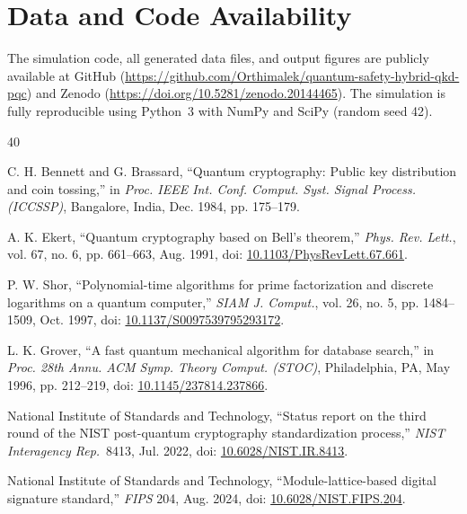 \documentclass[conference]{IEEEtran}
\begin{document}
\section*{Data and Code Availability}
The simulation code, all generated data files, and output figures are publicly available at GitHub (\url{https://github.com/Orthimalek/quantum-safety-hybrid-qkd-pqc}) and Zenodo (\url{https://doi.org/10.5281/zenodo.20144465}). The simulation is fully reproducible using Python~3 with NumPy and SciPy (random seed 42).

\begin{thebibliography}{40}

C. H. Bennett and G. Brassard, ``Quantum cryptography: Public key distribution and coin tossing,'' in \emph{Proc. IEEE Int. Conf. Comput. Syst. Signal Process. (ICCSSP)}, Bangalore, India, Dec. 1984, pp. 175--179.

A. K. Ekert, ``Quantum cryptography based on Bell's theorem,'' \emph{Phys. Rev. Lett.}, vol. 67, no. 6, pp. 661--663, Aug. 1991, doi: \href{https://doi.org/10.1103/PhysRevLett.67.661}{10.1103/PhysRevLett.67.661}.

P. W. Shor, ``Polynomial-time algorithms for prime factorization and discrete logarithms on a quantum computer,'' \emph{SIAM J. Comput.}, vol. 26, no. 5, pp. 1484--1509, Oct. 1997, doi: \href{https://doi.org/10.1137/S0097539795293172}{10.1137/S0097539795293172}.

L. K. Grover, ``A fast quantum mechanical algorithm for database search,'' in \emph{Proc. 28th Annu. ACM Symp. Theory Comput. (STOC)}, Philadelphia, PA, May 1996, pp. 212--219, doi: \href{https://doi.org/10.1145/237814.237866}{10.1145/237814.237866}.

National Institute of Standards and Technology, ``Status report on the third round of the NIST post-quantum cryptography standardization process,'' \emph{NIST Interagency Rep.}~8413, Jul. 2022, doi: \href{https://doi.org/10.6028/NIST.IR.8413}{10.6028/NIST.IR.8413}.

National Institute of Standards and Technology, ``Module-lattice-based digital signature standard,'' \emph{FIPS} 204, Aug. 2024, doi: \href{https://doi.org/10.6028/NIST.FIPS.204}{10.6028/NIST.FIPS.204}.


\end{thebibliography}
\end{document}
